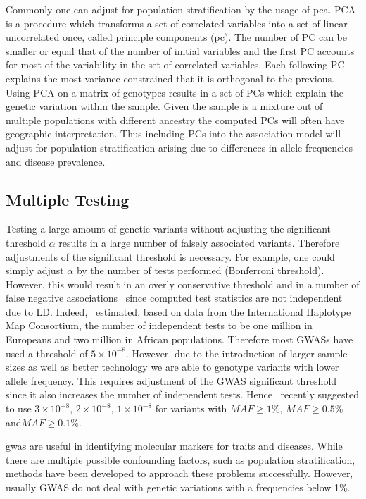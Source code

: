 Commonly one can adjust for population stratification by the usage of \acrfull{pca}.
PCA is a procedure which transforms a set of correlated variables into a set of linear uncorrelated once, called principle components (\acrshort{pc}).
The number of PC can be smaller or equal that of the number of initial variables and the first PC accounts for most of the variability in the set of correlated variables.
Each following PC explains the most variance constrained that it is orthogonal to the previous.
Using PCA on a matrix of genotypes results in a set of PCs which explain the genetic variation within the sample.
Given the sample is a mixture out of multiple populations with different ancestry the computed PCs will often have geographic interpretation.
Thus including PCs into the association model will adjust for population stratification arising due to differences in allele frequencies and disease prevalence.

\subsection{Multiple Testing}
\label{ssec:multiple_testing}

Testing a large amount of genetic variants without adjusting the significant threshold $\alpha$ results in a large number of falsely associated variants.
Therefore adjustments of the significant threshold is necessary.
For example, one could simply adjust $\alpha$ by the number of tests performed (Bonferroni threshold).
However, this would result in an overly conservative threshold and in a number of false negative associations~\cite{Benjamini1995} since computed test statistics are not independent due to LD\@.
Indeed,~\citet{Peer2008} estimated, based on data from the International Haplotype Map Consortium, the number of independent tests to be one million in Europeans and two million in African populations.
Therefore most GWASs have used a threshold of $5\times 10^{-8}$.
However, due to the introduction of larger sample sizes as well as better technology we are able to genotype variants with lower allele frequency.
This requires adjustment of the GWAS significant threshold since it also increases the number of independent tests.
Hence~\citet{Fadista2016} recently suggested to use $3\times10^{-8}$, $2\times10^{-8}$, $1\times10^{-8}$ for variants with $MAF\ge1\%$, $MAF\ge0.5\%$ and$ MAF\ge0.1\%$.

\acrshort{gwas} are useful in identifying molecular markers for traits and diseases.
While there are multiple possible confounding factors, such as population stratification, methods have been developed to approach these problems successfully.
However, usually GWAS do not deal with genetic variations with a frequencies below 1\%.

